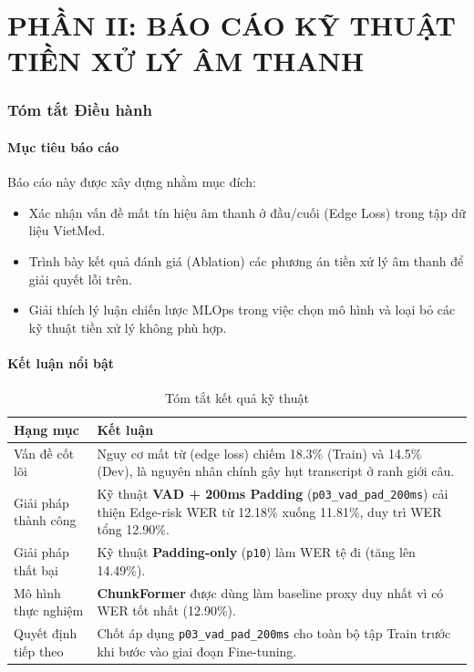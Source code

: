 \documentclass[12pt,a4paper]{article}
\begin{document}
\part*{PHẦN II: BÁO CÁO KỸ THUẬT TIỀN XỬ LÝ ÂM THANH}
\setcounter{section}{0}

\section{Tóm tắt Điều hành}

\subsection{Mục tiêu báo cáo}
Báo cáo này được xây dựng nhằm mục đích:
\begin{itemize}[leftmargin=1.2cm]
    \item Xác nhận vấn đề mất tín hiệu âm thanh ở đầu/cuối (Edge Loss) trong tập dữ liệu VietMed.
    \item Trình bày kết quả đánh giá (Ablation) các phương án tiền xử lý âm thanh để giải quyết lỗi trên.
    \item Giải thích lý luận chiến lược MLOps trong việc chọn mô hình và loại bỏ các kỹ thuật tiền xử lý không phù hợp.
\end{itemize}

\subsection{Kết luận nổi bật}

\begin{table}[h]
\centering
\caption{Tóm tắt kết quả kỹ thuật}
\begin{tabularx}{\textwidth}{|l|X|}
\hline
\textbf{Hạng mục} & \textbf{Kết luận} \\
\hline
Vấn đề cốt lõi & Nguy cơ mất từ (edge loss) chiếm 18.3\% (Train) và 14.5\% (Dev), là nguyên nhân chính gây hụt transcript ở ranh giới câu. \\
\hline
Giải pháp thành công & Kỹ thuật \textbf{VAD + 200ms Padding} (\texttt{p03\_vad\_pad\_200ms}) cải thiện Edge-risk WER từ 12.18\% xuống 11.81\%, duy trì WER tổng 12.90\%. \\
\hline
Giải pháp thất bại & Kỹ thuật \textbf{Padding-only} (\texttt{p10}) làm WER tệ đi (tăng lên 14.49\%). \\
\hline
Mô hình thực nghiệm & \textbf{ChunkFormer} được dùng làm baseline proxy duy nhất vì có WER tốt nhất (12.90\%). \\
\hline
Quyết định tiếp theo & Chốt áp dụng \texttt{p03\_vad\_pad\_200ms} cho toàn bộ tập Train trước khi bước vào giai đoạn Fine-tuning. \\
\hline
\end{tabularx}
\end{table}
\end{document}
